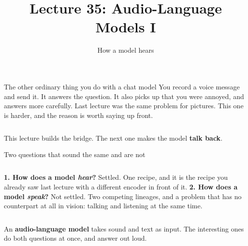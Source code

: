\documentclass[aspectratio=169]{beamer}
\title{Lecture 35: Audio-Language Models I}
\subtitle{How a model hears}
\date{}
\begin{document}
\begin{frame}
  \titlepage
\end{frame}

\begin{frame}{The other ordinary thing you do with a chat model}
  \small
  You record a voice message and send it. It answers the question. It also picks up that you
  were annoyed, and answers more carefully.
  \vskip 6pt
  Last lecture was the same problem for pictures. This one is harder, and the reason is worth
  saying up front.
  \vskip 8pt
  \begin{columns}[T]
  \end{columns}
  \vskip 8pt
  This lecture builds the bridge. The next one makes the model \textbf{talk back}.
\end{frame}

\begin{frame}{Two questions that sound the same and are not}
  \small
  \begin{columns}[T]
    \textbf{1. How does a model \emph{hear}?}
    \vskip 4pt
    \footnotesize
    Settled. One recipe, and it is the recipe you already saw last lecture with a different
    encoder in front of it.
    \vskip 6pt
    \textbf{2. How does a model \emph{speak}?}
    \vskip 4pt
    \footnotesize
    Not settled. Two competing lineages, and a problem that has no counterpart at all in
    vision: talking and listening at the same time.
    \vskip 6pt
  \end{columns}
  \vskip 10pt
  \centering
  An \textbf{audio-language model} takes sound and text as input. The interesting ones do both
  questions at once, and answer out loud.
\end{frame}
\end{document}
